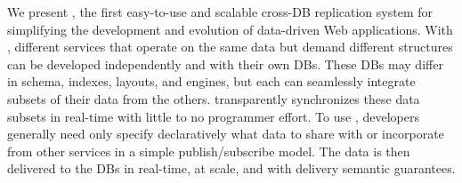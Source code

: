 

We present {\em \synapse}, the first easy-to-use and scalable
cross-DB replication system for simplifying the development and 
evolution of data-driven Web applications.  With \synapse, different
services that operate on the same data but demand
different structures can be developed independently and with their
own DBs. These DBs may differ in schema, indexes, layouts,
and engines, but each can seamlessly integrate subsets of
their data from the others.
\synapse transparently synchronizes these data subsets
in real-time with little to no programmer effort. To use \synapse,
developers generally need only specify declaratively what data to
share with or incorporate from other services in a simple
publish/subscribe model.  The data is then delivered to the DBs
in real-time, at scale, and with delivery semantic guarantees.

